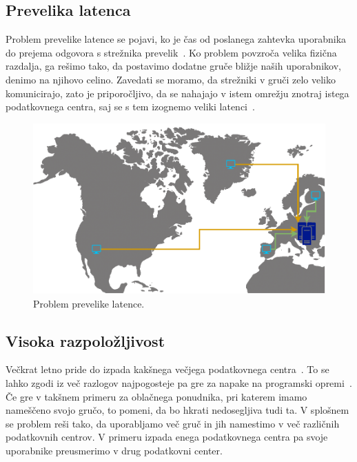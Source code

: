 \documentclass[a4paper, 12pt]{book}
\begin{document}
\subsection{Prevelika latenca}
Problem prevelike latence se pojavi, ko je čas od poslanega zahtevka uporabnika do prejema odgovora s strežnika prevelik~\cite{minimizing-latency}.
Ko problem povzroča velika fizična razdalja, ga rešimo tako, da postavimo dodatne gruče bližje naših uporabnikov, denimo na njihovo celino.
Zavedati se moramo, da strežniki v gruči zelo veliko komunicirajo, zato je priporočljivo, da se nahajajo v istem omrežju znotraj istega podatkovnega centra, saj se s tem izognemo veliki latenci~\cite{kube-and-edge}.
\begin{figure}[h]
\begin{center}
  \includegraphics[width=1.0\textwidth]{images/problem-prevelike-latence.pdf}
\end{center}
\caption{Problem prevelike latence.}
\label{problem-prevelike-latence}
\end{figure}
\subsection{Visoka razpoložljivost}
Večkrat letno pride do izpada kakšnega večjega podatkovnega centra~\cite{ha-systems}. 
To se lahko zgodi iz več razlogov najpogosteje pa gre za napake na programski opremi~\cite{common-outages}.
Če gre v takšnem primeru za oblačnega ponudnika, pri katerem imamo nameščeno svojo gručo, to pomeni, da bo hkrati nedosegljiva tudi ta.
V splošnem se problem reši tako, da uporabljamo več gruč in jih namestimo v več različnih podatkovnih centrov.
V primeru izpada enega podatkovnega centra pa svoje uporabnike preusmerimo v drug podatkovni center.
\end{document}
